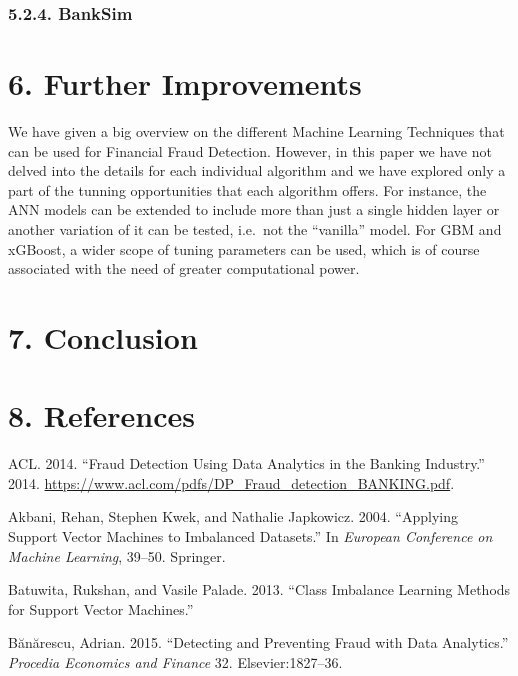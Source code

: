 \documentclass[12pt,]{article}
\begin{document}
\hypertarget{banksim-1}{%
\subsubsection{5.2.4. BankSim}\label{banksim-1}}

\hypertarget{further-improvements}{%
\section{6. Further Improvements}\label{further-improvements}}

We have given a big overview on the different Machine Learning
Techniques that can be used for Financial Fraud Detection. However, in
this paper we have not delved into the details for each individual
algorithm and we have explored only a part of the tunning opportunities
that each algorithm offers. For instance, the ANN models can be extended
to include more than just a single hidden layer or another variation of
it can be tested, i.e.~not the ``vanilla'' model. For GBM and xGBoost, a
wider scope of tuning parameters can be used, which is of course
associated with the need of greater computational power.

\hypertarget{conclusion}{%
\section{7. Conclusion}\label{conclusion}}

\hypertarget{references}{%
\section*{8. References}\label{references}}

\hypertarget{refs}{}
\leavevmode\hypertarget{ref-fraudanalyticsacl}{}%
ACL. 2014. ``Fraud Detection Using Data Analytics in the Banking
Industry.'' 2014.
\url{https://www.acl.com/pdfs/DP_Fraud_detection_BANKING.pdf}.

\leavevmode\hypertarget{ref-akbani2004applying}{}%
Akbani, Rehan, Stephen Kwek, and Nathalie Japkowicz. 2004. ``Applying
Support Vector Machines to Imbalanced Datasets.'' In \emph{European
Conference on Machine Learning}, 39--50. Springer.

\leavevmode\hypertarget{ref-batuwita2013class}{}%
Batuwita, Rukshan, and Vasile Palade. 2013. ``Class Imbalance Learning
Methods for Support Vector Machines.''

\leavevmode\hypertarget{ref-buanuarescu2015detecting}{}%
Bănărescu, Adrian. 2015. ``Detecting and Preventing Fraud with Data
Analytics.'' \emph{Procedia Economics and Finance} 32.
Elsevier:1827--36.
\end{document}
